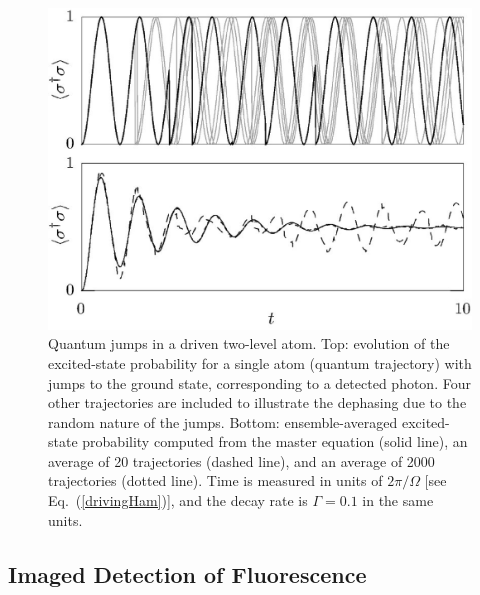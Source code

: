 \documentclass[12pt,aps,onecolum,superscriptaddress,footinbib,floatfix,showpacs]{revtex4-1}
\begin{document}
\begin{figure}[tb]
  \begin{center}
     \includegraphics[width=.6\hsize]{se-trajs-plot-mod.bmap.250.eps}
   \end{center}
  \vspace{-5mm}
  \caption
        {Quantum jumps in a driven two-level atom.
         Top: evolution of the excited-state probability
         for a single atom (quantum trajectory) with jumps to the ground state,
         corresponding to a detected photon.
         Four other trajectories are included to illustrate the
         dephasing due to the
         random nature of the jumps.
         Bottom: ensemble-averaged 
         excited-state probability computed from the 
         master equation (solid line), an
         average of 20 trajectories (dashed line), and an
         average of 2000 trajectories (dotted line).
         Time is measured in units of $2\pi/\Omega$ [see 
         Eq.~(\ref{drivingHam})],
         and the decay rate is $\Gamma=0.1$ in the same units.
	\label{fig:jumps}}
\end{figure}




\subsection{Imaged Detection of Fluorescence}
\end{document}
